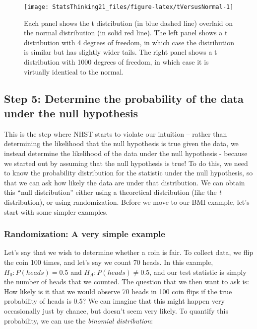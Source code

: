 \documentclass[12pt,]{book}
\theoremstyle{definition}
\theoremstyle{definition}
\theoremstyle{definition}
\theoremstyle{remark}
\begin{document}
\begin{figure}
\texttt{[image: StatsThinking21\_files/figure-latex/tVersusNormal-1]} \caption{Each panel shows the t distribution (in blue dashed line) overlaid on the normal distribution (in solid red line).  The left panel shows a t distribution with 4 degrees of freedom, in which case the distribution is similar but has slightly wider tails.  The right panel shows a t distribution with 1000 degrees of freedom, in which case it is virtually identical to the normal.}\label{fig:tVersusNormal}
\end{figure}

\hypertarget{step-5-determine-the-probability-of-the-data-under-the-null-hypothesis}{%
\subsection{Step 5: Determine the probability of the data under the null hypothesis}\label{step-5-determine-the-probability-of-the-data-under-the-null-hypothesis}}

This is the step where NHST starts to violate our intuition -- rather than determining the likelihood that the null hypothesis is true given the data, we instead determine the likelihood of the data under the null hypothesis - because we started out by assuming that the null hypothesis is true! To do this, we need to know the probability distribution for the statistic under the null hypothesis, so that we can ask how likely the data are under that distribution. We can obtain this ``null distribution'' either using a theoretical distribution (like the \emph{t} distribution), or using randomization. Before we move to our BMI example, let's start with some simpler examples.

\hypertarget{randomization-very-simple}{%
\subsubsection{Randomization: A very simple example}\label{randomization-very-simple}}

Let's say that we wish to determine whether a coin is fair. To collect data, we flip the coin 100 times, and let's say we count 70 heads. In this example, \(H_0: P(heads)=0.5\) and \(H_A: P(heads) \neq 0.5\), and our test statistic is simply the number of heads that we counted. The question that we then want to ask is: How likely is it that we would observe 70 heads in 100 coin flips if the true probability of heads is 0.5? We can imagine that this might happen very occasionally just by chance, but doesn't seem very likely. To quantify this probability, we can use the \emph{binomial distribution}:
\end{document}
